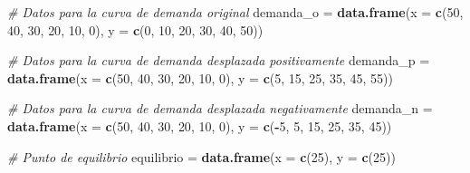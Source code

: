 \documentclass[
  spanish,
  12pt,
]{book}
\newenvironment{Shaded}{\begin{snugshade}}{\end{snugshade}}
\newcommand{\AttributeTok}[1]{\textcolor[rgb]{0.13,0.29,0.53}{#1}}
\newcommand{\CommentTok}[1]{\textcolor[rgb]{0.56,0.35,0.01}{\textit{#1}}}
\newcommand{\DecValTok}[1]{\textcolor[rgb]{0.00,0.00,0.81}{#1}}
\newcommand{\FunctionTok}[1]{\textcolor[rgb]{0.13,0.29,0.53}{\textbf{#1}}}
\newcommand{\NormalTok}[1]{#1}
\newcommand{\OtherTok}[1]{\textcolor[rgb]{0.56,0.35,0.01}{#1}}
\newcommand{\SpecialCharTok}[1]{\textcolor[rgb]{0.81,0.36,0.00}{\textbf{#1}}}
\begin{document}
\begin{Shaded}
\begin{Highlighting}[]
\CommentTok{\# Datos para la curva de demanda original}
\NormalTok{demanda\_o }\OtherTok{=} \FunctionTok{data.frame}\NormalTok{(}\AttributeTok{x =} \FunctionTok{c}\NormalTok{(}\DecValTok{50}\NormalTok{, }\DecValTok{40}\NormalTok{, }\DecValTok{30}\NormalTok{, }\DecValTok{20}\NormalTok{, }\DecValTok{10}\NormalTok{, }\DecValTok{0}\NormalTok{), }
                       \AttributeTok{y =} \FunctionTok{c}\NormalTok{(}\DecValTok{0}\NormalTok{, }\DecValTok{10}\NormalTok{, }\DecValTok{20}\NormalTok{, }\DecValTok{30}\NormalTok{, }\DecValTok{40}\NormalTok{, }\DecValTok{50}\NormalTok{))}

\CommentTok{\# Datos para la curva de demanda desplazada positivamente}
\NormalTok{demanda\_p }\OtherTok{=} \FunctionTok{data.frame}\NormalTok{(}\AttributeTok{x =} \FunctionTok{c}\NormalTok{(}\DecValTok{50}\NormalTok{, }\DecValTok{40}\NormalTok{, }\DecValTok{30}\NormalTok{, }\DecValTok{20}\NormalTok{, }\DecValTok{10}\NormalTok{, }\DecValTok{0}\NormalTok{), }
                       \AttributeTok{y =} \FunctionTok{c}\NormalTok{(}\DecValTok{5}\NormalTok{, }\DecValTok{15}\NormalTok{, }\DecValTok{25}\NormalTok{, }\DecValTok{35}\NormalTok{, }\DecValTok{45}\NormalTok{, }\DecValTok{55}\NormalTok{))}

\CommentTok{\# Datos para la curva de demanda desplazada negativamente}
\NormalTok{demanda\_n }\OtherTok{=} \FunctionTok{data.frame}\NormalTok{(}\AttributeTok{x =} \FunctionTok{c}\NormalTok{(}\DecValTok{50}\NormalTok{, }\DecValTok{40}\NormalTok{, }\DecValTok{30}\NormalTok{, }\DecValTok{20}\NormalTok{, }\DecValTok{10}\NormalTok{, }\DecValTok{0}\NormalTok{), }
                       \AttributeTok{y =} \FunctionTok{c}\NormalTok{(}\SpecialCharTok{{-}}\DecValTok{5}\NormalTok{, }\DecValTok{5}\NormalTok{, }\DecValTok{15}\NormalTok{, }\DecValTok{25}\NormalTok{, }\DecValTok{35}\NormalTok{, }\DecValTok{45}\NormalTok{))}

\CommentTok{\# Punto de equilibrio}
\NormalTok{equilibrio }\OtherTok{=} \FunctionTok{data.frame}\NormalTok{(}\AttributeTok{x =} \FunctionTok{c}\NormalTok{(}\DecValTok{25}\NormalTok{), }\AttributeTok{y =} \FunctionTok{c}\NormalTok{(}\DecValTok{25}\NormalTok{))}


\end{Highlighting}
\end{Shaded}
\end{document}
